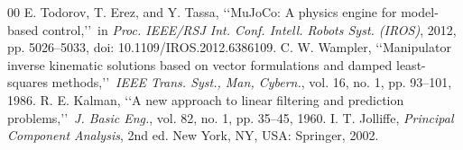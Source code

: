 \documentclass[conference]{IEEEtran}
\begin{document}
\begin{thebibliography}{00}
E. Todorov, T. Erez, and Y. Tassa, \lq\lq MuJoCo: A physics engine for model-based control,\rq\rq\ in \emph{Proc. IEEE/RSJ Int. Conf. Intell. Robots Syst. (IROS)}, 2012, pp. 5026--5033, doi: 10.1109/IROS.2012.6386109.
C. W. Wampler, \lq\lq Manipulator inverse kinematic solutions based on vector formulations and damped least-squares methods,\rq\rq\ \emph{IEEE Trans. Syst., Man, Cybern.}, vol. 16, no. 1, pp. 93--101, 1986.
R. E. Kalman, \lq\lq A new approach to linear filtering and prediction problems,\rq\rq\ \emph{J. Basic Eng.}, vol. 82, no. 1, pp. 35--45, 1960.
I. T. Jolliffe, \emph{Principal Component Analysis}, 2nd ed. New York, NY, USA: Springer, 2002.
\end{thebibliography}
\end{document}
